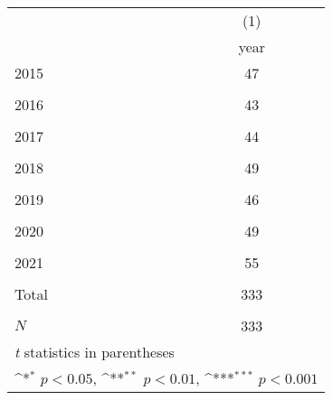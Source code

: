 {
\def\sym#1{\ifmmode^{#1}\else\(^{#1}\)\fi}
\begin{tabular}{l*{1}{c}}
\hline\hline
            &\multicolumn{1}{c}{(1)}\\
            &\multicolumn{1}{c}{year}\\
\hline
2015        &          47         \\
            &                     \\
[1em]
2016        &          43         \\
            &                     \\
[1em]
2017        &          44         \\
            &                     \\
[1em]
2018        &          49         \\
            &                     \\
[1em]
2019        &          46         \\
            &                     \\
[1em]
2020        &          49         \\
            &                     \\
[1em]
2021        &          55         \\
            &                     \\
[1em]
Total       &         333         \\
            &                     \\
\hline
\(N\)       &         333         \\
\hline\hline
\multicolumn{2}{l}{\footnotesize \textit{t} statistics in parentheses}\\
\multicolumn{2}{l}{\footnotesize \sym{*} \(p<0.05\), \sym{**} \(p<0.01\), \sym{***} \(p<0.001\)}\\
\end{tabular}
}
